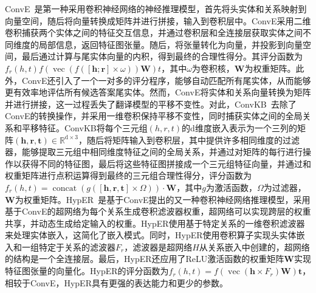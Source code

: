 \documentclass[algorithmlist, AutoFakeBold, AutoFakeSlant, figurelist, tablelist, nomlist, engineering, openany]{seuthesix} %
\begin{document}
ConvE~\cite{dettmers2018convolutional}是第一种采用卷积神经网络的神经推理模型，首先将头实体和关系映射到向量空间，随后将向量转换成矩阵并进行拼接，输入到卷积层中。ConvE采用二维卷积捕获两个实体之间的特征交互信息，并通过卷积层和全连接层获取实体之间不同维度的局部信息，返回特征图张量。随后，将张量转化为向量，并投影到向量空间，最后通过计算与尾实体向量的内积，得到最终的合理性得分。其评分函数为$f_r\left(h, t\right)f(\operatorname{vec}(f([\bm{h} ; \bm{r}] \times \omega)) \mathbf{W}) t$，其中$\omega$为卷积核，$\mathbf{W}$为权重矩阵。此外，ConvE还引入了一个一对多的评分程序，能够自动匹配所有尾实体，从而能够更有效率地评估所有候选答案尾实体。然而，ConvE将实体和关系向量转换为矩阵并进行拼接，这一过程丢失了翻译模型的平移不变性。对此，ConvKB~\cite{nguyen2018novel}去除了ConvE的转换操作，并采用一维卷积保持平移不变性，同时捕获实体之间的全局关系和平移特征。ConvKB将每个三元组$(h, r, t)$的d维度嵌入表示为一个三列的矩阵$(\bm{h}, \bm{r}, \bm{t}) \in \mathbb{R}^{\mathrm{d} \times 3}$，随后将矩阵输入到卷积层，其中提供许多相同维度的过滤器，能够提取三元组中相同维度特征之间的全局关系，并通过对矩阵的每行进行操作以获得不同的特征图，最后将这些特征图拼接成一个三元组特征向量，并通过和权重矩阵进行点积运算得到最终的三元组合理性得分，评分函数为$f_r(h, t)=\operatorname{concat}(g([\bm{h}, \bm{r}, \bm{t}] \times \Omega)) \cdot \mathbf{W}$，其中$g$为激活函数，$\Omega$为过滤器，$\mathbf{W}$为权重矩阵。HypER~\cite{balazevic2019hypernetwork}是基于ConvE提出的又一种卷积神经网络推理模型，采用基于ConvE的超网络为每个关系生成卷积滤波器权重，超网络可以实现跨层的权重共享，并动态生成给定输入的权重。HypER使用基于特定关系的一维卷积滤波器来处理实体嵌入，这简化了嵌入模式。同时，HypER使用卷积算子实现头实体嵌入和一组特定于关系的滤波器$F_r$，滤波器是超网络$H$从关系嵌入中创建的，超网络的结构是一个全连接层。最后，HypER还应用了ReLU激活函数的权重矩阵$\mathbf{W}$实现特征图张量的向量化。HypER的评分函数为$f_r(h, t)=f\left(\operatorname{vec}\left(\bm{h} \times F_r\right) \mathbf{W}\right) \bm{t}$，相较于ConvE，HypER具有更强的表达能力和更少的参数。
\end{document}
